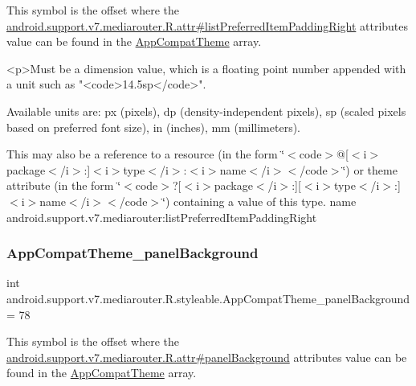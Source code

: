 This symbol is the offset where the \hyperlink{classandroid_1_1support_1_1v7_1_1mediarouter_1_1R_1_1attr_ab8b4729519d0a70934dac6d8504e64cf}{android.\+support.\+v7.\+mediarouter.\+R.\+attr\#list\+Preferred\+Item\+Padding\+Right} attribute\textquotesingle{}s value can be found in the \hyperlink{classandroid_1_1support_1_1v7_1_1mediarouter_1_1R_1_1styleable_a4e3d3900c75d49aeb2f283cac00214d6}{App\+Compat\+Theme} array.

\begin{DoxyVerb}      <p>Must be a dimension value, which is a floating point number appended with a unit such as "<code>14.5sp</code>".
\end{DoxyVerb}
 Available units are\+: px (pixels), dp (density-\/independent pixels), sp (scaled pixels based on preferred font size), in (inches), mm (millimeters). 

This may also be a reference to a resource (in the form \char`\"{}$<$code$>$@\mbox{[}$<$i$>$package$<$/i$>$\+:\mbox{]}$<$i$>$type$<$/i$>$\+:$<$i$>$name$<$/i$>$$<$/code$>$\char`\"{}) or theme attribute (in the form \char`\"{}$<$code$>$?\mbox{[}$<$i$>$package$<$/i$>$\+:\mbox{]}\mbox{[}$<$i$>$type$<$/i$>$\+:\mbox{]}$<$i$>$name$<$/i$>$$<$/code$>$\char`\"{}) containing a value of this type.  name android.\+support.\+v7.\+mediarouter\+:list\+Preferred\+Item\+Padding\+Right \mbox{\label{classandroid_1_1support_1_1v7_1_1mediarouter_1_1R_1_1styleable_a13f22c89f103a45bf6f2cec79f941159}} 
\subsubsection{\texorpdfstring{App\+Compat\+Theme\+\_\+panel\+Background}{AppCompatTheme\_panelBackground}}
{\footnotesize\ttfamily int android.\+support.\+v7.\+mediarouter.\+R.\+styleable.\+App\+Compat\+Theme\+\_\+panel\+Background = 78\hspace{0.3cm}{\ttfamily [static]}}

This symbol is the offset where the \hyperlink{classandroid_1_1support_1_1v7_1_1mediarouter_1_1R_1_1attr_a1d98e884dfa8884e0fb449668c534c55}{android.\+support.\+v7.\+mediarouter.\+R.\+attr\#panel\+Background} attribute\textquotesingle{}s value can be found in the \hyperlink{classandroid_1_1support_1_1v7_1_1mediarouter_1_1R_1_1styleable_a4e3d3900c75d49aeb2f283cac00214d6}{App\+Compat\+Theme} array.


